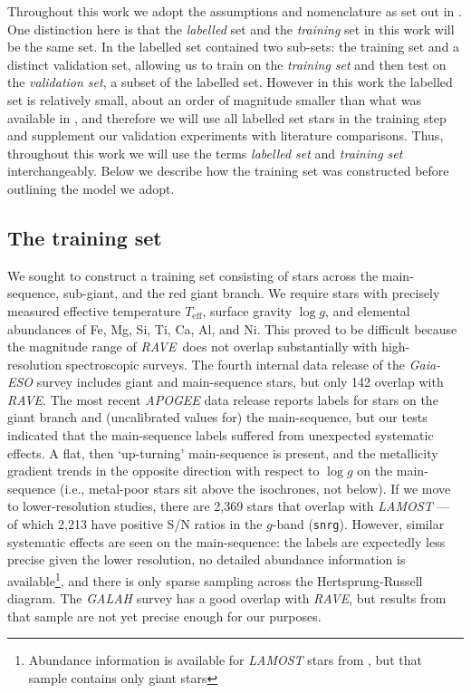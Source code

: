 \documentclass[preprint,trackchanges]{aastex}
\newcommand{\project}[1]{\textsl{#1}}
\newcommand{\acronym}[1]{{\small{#1}}}
\newcommand{\rave}{\project{\acronym{RAVE}}}
\newcommand{\logg}{\log g}
\newcommand{\teff}{T_{\mathrm{eff}}}
\begin{document}
Throughout this work we adopt the assumptions and nomenclature as set out in
\citet{Casey_2016}.  One distinction here is that the \emph{labelled} set and
the \emph{training} set in this work will be the same set.  In \citet{Casey_2016}
the labelled set contained two sub-sets: the training set and a distinct
validation set, allowing us to train on the \emph{training set} and then test
on the \emph{validation set}, a subset of the labelled set.  However in this work
the labelled set is relatively small, about an order of magnitude smaller than 
what was available in \citet{Casey_2016}, and therefore we will use all labelled 
set stars in the training step and supplement our validation experiments with 
literature comparisons.  Thus, throughout this work we will use the terms 
\emph{labelled set} and \emph{training set} interchangeably.  Below we describe 
how the training set was constructed before outlining the model we adopt.

\subsection{The training set}
\label{sec:the-training-set}

We sought to construct a training set consisting of stars across the main-sequence,
sub-giant, and the red giant branch.  We require stars with precisely measured
effective temperature $\teff$, surface gravity $\logg$, and elemental abundances
of Fe, Mg, Si, Ti, Ca, Al, and Ni.  This proved to be difficult because the magnitude
range of \rave\ does not overlap substantially with high-resolution spectroscopic
surveys.  The fourth internal data release of the \project{Gaia-ESO} survey includes 
giant and main-sequence stars, but only 142 overlap with \rave.  The most recent 
\project{APOGEE} data release \citep{sloan_dr13} reports labels for stars on the
giant branch and (uncalibrated values for) the main-sequence, but our tests indicated
that the main-sequence labels suffered from unexpected systematic effects.  A flat, 
then `up-turning' main-sequence is present, and the metallicity gradient trends in 
the opposite direction with respect to $\logg$ on the main-sequence (i.e., metal-poor
stars sit above the isochrones, not below).  If we move to lower-resolution studies,
there are 2,369 stars that overlap with \project{LAMOST} --- of which 2,213 have positive
S/N ratios in the $g$-band (\texttt{snrg}).  However, similar systematic effects are 
seen on the main-sequence: the labels are expectedly less precise given the lower
resolution, no detailed abundance information is available\footnote{Abundance 
information is available for \project{LAMOST} stars from \citet{Ho_2016}, but that 
sample contains only giant stars}, and there is only sparse sampling across the 
Hertsprung-Russell diagram.  The \project{GALAH} survey has a good overlap with \rave,
but results from that sample are not yet precise enough for our purposes.
\end{document}

